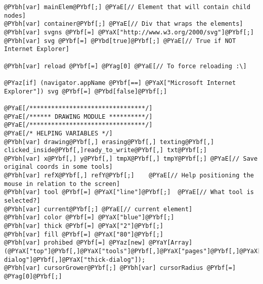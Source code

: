 \begin{Verbatim}[commandchars=@\[\]]
@PYbh[var] mainElem@PYbf[;] @PYaE[// Element that will contain child nodes]
@PYbh[var] container@PYbf[;] @PYaE[// Div that wraps the elements]
@PYbh[var] svgns @PYbf[=] @PYaX["http://www.w3.org/2000/svg"]@PYbf[;]
@PYbh[var] svg @PYbf[=] @PYbd[true]@PYbf[;] @PYaE[// True if NOT Internet Explorer]

@PYbh[var] reload @PYbf[=] @PYag[0] @PYaE[// To force reloading :\]

@PYaz[if] (navigator.appName @PYbf[==] @PYaX["Microsoft Internet Explorer"]) svg @PYbf[=] @PYbd[false]@PYbf[;]

@PYaE[/********************************/]
@PYaE[/****** DRAWING MODULE **********/]
@PYaE[/********************************/]
@PYaE[/* HELPING VARIABLES */]
@PYbh[var] drawing@PYbf[,] erasing@PYbf[,] texting@PYbf[,] clicked_inside@PYbf[,]ready_to_write@PYbf[,] txt@PYbf[;]
@PYbh[var] x@PYbf[,] y@PYbf[,] tmpX@PYbf[,] tmpY@PYbf[;] @PYaE[// Save original coords in some tools]
@PYbh[var] refX@PYbf[,] refY@PYbf[;] 	@PYaE[// Help positioning the mouse in relation to the screen]
@PYbh[var] tool @PYbf[=] @PYaX["line"]@PYbf[;] 	@PYaE[// What tool is selected?]
@PYbh[var] current@PYbf[;] @PYaE[// current element]
@PYbh[var] color @PYbf[=] @PYaX["blue"]@PYbf[;]
@PYbh[var] thick @PYbf[=] @PYaX["2"]@PYbf[;]
@PYbh[var] fill @PYbf[=] @PYaX["80"]@PYbf[;]
@PYbh[var] prohibed @PYbf[=] @PYaz[new] @PYaY[Array](@PYaX["top"]@PYbf[,]@PYaX["tools"]@PYbf[,]@PYaX["pages"]@PYbf[,]@PYaX["fill-dialog"]@PYbf[,]@PYaX["thick-dialog"]); 
@PYbh[var] cursorGrower@PYbf[;] @PYbh[var] cursorRadius @PYbf[=] @PYag[0]@PYbf[;]


\end{Verbatim}
